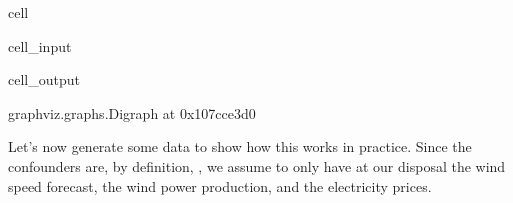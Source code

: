 \documentclass[letterpaper,10pt,english]{jupyterBook}
\begin{document}
\begin{sphinxuseclass}{cell}
\begin{sphinxVerbatimInput}
\begin{sphinxuseclass}{cell_input}
\end{sphinxuseclass}\end{sphinxVerbatimInput}
\begin{sphinxVerbatimOutput}

\begin{sphinxuseclass}{cell_output}
\begin{sphinxVerbatim}[commandchars=\\\{\}]
\PYGZlt{}graphviz.graphs.Digraph at 0x107cce3d0\PYGZgt{}
\end{sphinxVerbatim}

\end{sphinxuseclass}\end{sphinxVerbatimOutput}

\end{sphinxuseclass}
\sphinxAtStartPar
Let’s now generate some data to show how this works in practice. Since the confounders are, by definition, , we assume to only have at our disposal the wind speed forecast, the wind power production, and the electricity prices.
\end{document}
